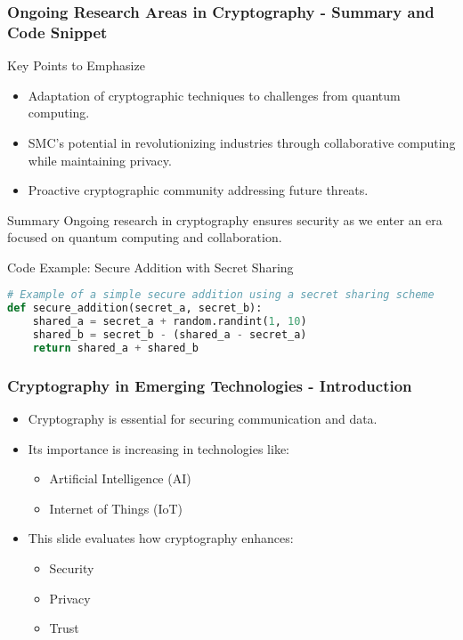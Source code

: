 \documentclass{beamer}
\begin{document}
\begin{frame}[fragile]
    \frametitle{Ongoing Research Areas in Cryptography - Summary and Code Snippet}
    \begin{block}{Key Points to Emphasize}
        \begin{itemize}
            \item Adaptation of cryptographic techniques to challenges from quantum computing.
            \item SMC's potential in revolutionizing industries through collaborative computing while maintaining privacy.
            \item Proactive cryptographic community addressing future threats.
        \end{itemize}
    \end{block}
    
    \begin{block}{Summary}
        Ongoing research in cryptography ensures security as we enter an era focused on quantum computing and collaboration.
    \end{block}

    \begin{block}{Code Example: Secure Addition with Secret Sharing}
        \begin{lstlisting}[language=Python]
# Example of a simple secure addition using a secret sharing scheme
def secure_addition(secret_a, secret_b):
    shared_a = secret_a + random.randint(1, 10)
    shared_b = secret_b - (shared_a - secret_a)
    return shared_a + shared_b
        \end{lstlisting}
    \end{block}
\end{frame}

\begin{frame}[fragile]
    \frametitle{Cryptography in Emerging Technologies - Introduction}
    \begin{itemize}
        \item Cryptography is essential for securing communication and data.
        \item Its importance is increasing in technologies like:
        \begin{itemize}
            \item Artificial Intelligence (AI)
            \item Internet of Things (IoT)
        \end{itemize}
        \item This slide evaluates how cryptography enhances:
        \begin{itemize}
            \item Security
            \item Privacy
            \item Trust
        \end{itemize}
    \end{itemize}
\end{frame}
\end{document}

